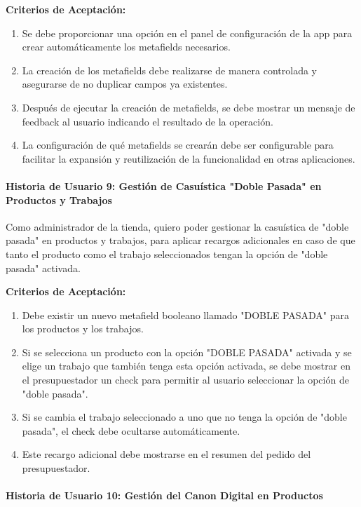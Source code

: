 \documentclass[12pt]{article}
\newcommand{\subsubsubsection}[1]{\paragraph{#1}}
\begin{document}
\vspace{0.5cm}
\textbf{Criterios de Aceptación:}
\begin{enumerate}[label=\arabic*.]
    \item Se debe proporcionar una opción en el panel de configuración de la app para crear automáticamente los metafields necesarios.
    \item La creación de los metafields debe realizarse de manera controlada y asegurarse de no duplicar campos ya existentes.
    \item Después de ejecutar la creación de metafields, se debe mostrar un mensaje de feedback al usuario indicando el resultado de la operación.
    \item La configuración de qué metafields se crearán debe ser configurable para facilitar la expansión y reutilización de la funcionalidad en otras aplicaciones.
\end{enumerate}


\subsubsubsection{Historia de Usuario 9: Gestión de Casuística "Doble Pasada" en Productos y Trabajos}\label{sec:historia9}

Como administrador de la tienda,
quiero poder gestionar la casuística de "doble pasada" en productos y trabajos,
para aplicar recargos adicionales en caso de que tanto el producto como el trabajo seleccionados tengan la opción de "doble pasada" activada.

\vspace{0.5cm}
\textbf{Criterios de Aceptación:}
\begin{enumerate}[label=\arabic*.]
    \item Debe existir un nuevo metafield booleano llamado "DOBLE PASADA" para los productos y los trabajos.
    \item Si se selecciona un producto con la opción "DOBLE PASADA" activada y se elige un trabajo que también tenga esta opción activada, se debe mostrar en el presupuestador un check para permitir al usuario seleccionar la opción de "doble pasada".
    \item Si se cambia el trabajo seleccionado a uno que no tenga la opción de "doble pasada", el check debe ocultarse automáticamente.
    \item Este recargo adicional debe mostrarse en el resumen del pedido del presupuestador.
\end{enumerate}


\subsubsubsection{Historia de Usuario 10: Gestión del Canon Digital en Productos}\label{sec:historia10}
\end{document}
